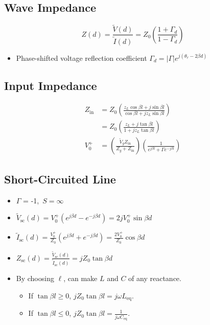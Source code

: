 \documentclass[a4paper]{article}
\begin{document}
\subsection{Wave Impedance}
$$Z(d) = \frac{\widetilde{V}(d)}{\widetilde{I}(d)} = Z_0\left(\frac{1+\Gamma_d}{1-\Gamma_d}\right)$$
\begin{itemize}
    \item Phase-shifted voltage reflection coefficient $\Gamma_d = |\Gamma|e^{j(\theta_r-2\beta d)}$
\end{itemize}

\subsection{Input Impedance}
\begin{align*}
    Z_{\text{in}} &= Z_0\left(\frac{z_L\cos\beta l+j\sin \beta l}{\cos\beta l+jz_L\sin\beta l}\right)\\
    &= Z_0\left(\frac{z_L+j\tan\beta l}{1+jz_L\tan\beta l}\right)\\
    V_0^+ &= \left(\frac{\widetilde{V}_{g}Z_\text{in}}{Z_g+Z_\text{in}}\right)\left(\frac{1}{e^{j\beta l}+\Gamma e^{-j\beta l}}\right)
\end{align*}

\newpage
\subsection{Short-Circuited Line}
\begin{itemize}
    \item $\Gamma$ = -1,\ $S = \infty$
    \item $\widetilde{V}_\text{sc}(d) =  V_0^+\left(e^{j\beta d}-e^{-j\beta d}\right) = 2jV_0^+\sin\beta d$
    \item $\widetilde{I}_\text{sc}(d) = \displaystyle\frac{V_0^+}{Z_0}\left(e^{j\beta d}+e^{-j\beta d}\right) = \displaystyle\frac{2V_0^+}{Z_0}\cos\beta d$
    \item $Z_\text{sc}(d) = \displaystyle\frac{\widetilde{V}_\text{sc}(d)}{\widetilde{I}_\text{sc}(d)} = jZ_0\tan\beta d$
    \item By choosing $\ell$, can make $L$ and $C$ of any reactance.
    \begin{itemize}[label=$\circ$]
        \item If $\tan\beta l \geq 0$, $jZ_0\tan\beta l = j\omega L_\text{eq}$.
        \item If $\tan\beta l \leq 0$, $jZ_0\tan\beta l = \displaystyle\frac{1}{j\omega C_\text{eq}}$.
    \end{itemize}
\end{itemize}
\end{document}
